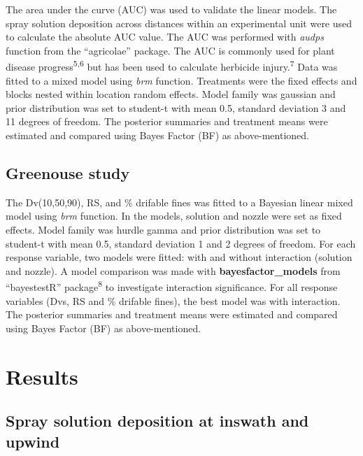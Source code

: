 \documentclass[
  12pt,
  a4paper,
]{article}
\begin{document}
The area under the curve (AUC) was used to validate the linear models.
The spray solution deposition across distances within an experimental
unit were used to calculate the absolute AUC value. The AUC was
performed with \emph{audps} function from the ``agricolae'' package. The
AUC is commonly used for plant disease progress\textsuperscript{5,6} but
has been used to calculate herbicide injury.\textsuperscript{7} Data was
fitted to a mixed model using \emph{brm} function. Treatments were the
fixed effects and blocks nested within location random effects. Model
family was gaussian and prior distribution was set to student-t with
mean 0.5, standard deviation 3 and 11 degrees of freedom. The posterior
summaries and treatment means were estimated and compared using Bayes
Factor (BF) as above-mentioned.

\hypertarget{greenouse-study}{%
\subsection{Greenouse study}\label{greenouse-study}}

The Dv(10,50,90), RS, and \% drifable fines was fitted to a Bayesian
linear mixed model using \emph{brm} function. In the models, solution
and nozzle were set as fixed effects. Model family was hurdle gamma and
prior distribution was set to student-t with mean 0.5, standard
deviation 1 and 2 degrees of freedom. For each response variable, two
models were fitted: with and without interaction (solution and nozzle).
A model comparison was made with \textbf{bayesfactor\_models} from
``bayestestR'' package\textsuperscript{8} to investigate interaction
significance. For all response variables (Dvs, RS and \% drifable
fines), the best model was with interaction. The posterior summaries and
treatment means were estimated and compared using Bayes Factor (BF) as
above-mentioned.

\hypertarget{results}{%
\section{Results}\label{results}}

\hypertarget{spray-solution-deposition-at-inswath-and-upwind}{%
\subsection{Spray solution deposition at inswath and
upwind}\label{spray-solution-deposition-at-inswath-and-upwind}}
\end{document}

